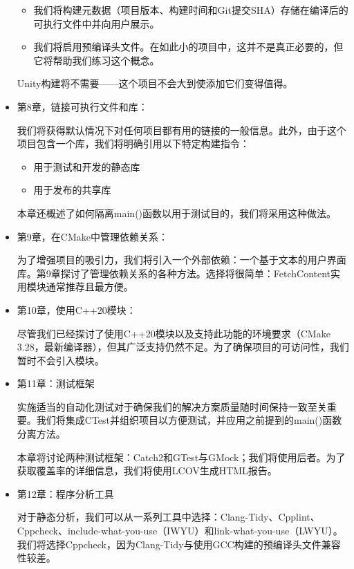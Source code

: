 \begin{itemize}
\begin{itemize}
\item
我们将构建元数据（项目版本、构建时间和Git提交SHA）存储在编译后的可执行文件中并向用户展示。

\item
我们将启用预编译头文件。在如此小的项目中，这并不是真正必要的，但它将帮助我们练习这个概念。
\end{itemize}

Unity构建将不需要——这个项目不会大到使添加它们变得值得。

\item
第8章，链接可执行文件和库：

我们将获得默认情况下对任何项目都有用的链接的一般信息。此外，由于这个项目包含一个库，我们将明确引用以下特定构建指令：

\begin{itemize}
\item
用于测试和开发的静态库

\item
用于发布的共享库
\end{itemize}

本章还概述了如何隔离main()函数以用于测试目的，我们将采用这种做法。

\item
第9章，在CMake中管理依赖关系：

为了增强项目的吸引力，我们将引入一个外部依赖：一个基于文本的用户界面库。第9章探讨了管理依赖关系的各种方法。选择将很简单：FetchContent实用模块通常推荐且最方便。

\item
第10章，使用C++20模块：

尽管我们已经探讨了使用C++20模块以及支持此功能的环境要求（CMake 3.28，最新编译器），但其广泛支持仍然不足。为了确保项目的可访问性，我们暂时不会引入模块。

\item
第11章：测试框架

实施适当的自动化测试对于确保我们的解决方案质量随时间保持一致至关重要。我们将集成CTest并组织项目以方便测试，并应用之前提到的main()函数分离方法。

本章将讨论两种测试框架：Catch2和GTest与GMock；我们将使用后者。为了获取覆盖率的详细信息，我们将使用LCOV生成HTML报告。

\item
第12章：程序分析工具

对于静态分析，我们可以从一系列工具中选择：Clang-Tidy、Cpplint、Cppcheck、include-what-you-use（IWYU）和link-what-you-use（LWYU）。我们将选择Cppcheck，因为Clang-Tidy与使用GCC构建的预编译头文件兼容性较差。


\end{itemize}
